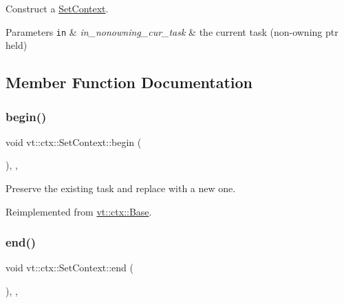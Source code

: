 Construct a {\ttfamily \hyperlink{structvt_1_1ctx_1_1_set_context}{Set\+Context}}. 


\begin{DoxyParams}[1]{Parameters}
\mbox{\tt in}  & {\em in\+\_\+nonowning\+\_\+cur\+\_\+task} & the current task (non-\/owning ptr held) \\
\hline
\end{DoxyParams}


\subsection{Member Function Documentation}
\mbox{\label{structvt_1_1ctx_1_1_set_context_aa882626f5fcf98cd6e8aa61c59395b5a}} 
\subsubsection{\texorpdfstring{begin()}{begin()}}
{\footnotesize\ttfamily void vt\+::ctx\+::\+Set\+Context\+::begin (\begin{DoxyParamCaption}{ }\end{DoxyParamCaption})\hspace{0.3cm}{\ttfamily [final]}, {\ttfamily [override]}, {\ttfamily [virtual]}}



Preserve the existing task and replace with a new one. 



Reimplemented from \hyperlink{structvt_1_1ctx_1_1_base_aab5524952e1bb163ccba5df64a303168}{vt\+::ctx\+::\+Base}.

\mbox{\label{structvt_1_1ctx_1_1_set_context_a17029268846a24e61fa35339e9bdcc10}} 
\subsubsection{\texorpdfstring{end()}{end()}}
{\footnotesize\ttfamily void vt\+::ctx\+::\+Set\+Context\+::end (\begin{DoxyParamCaption}{ }\end{DoxyParamCaption})\hspace{0.3cm}{\ttfamily [final]}, {\ttfamily [override]}, {\ttfamily [virtual]}}



